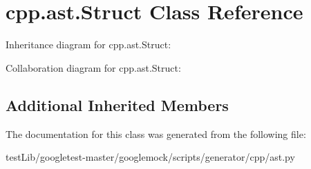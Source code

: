\hypertarget{classcpp_1_1ast_1_1Struct}{}\section{cpp.\+ast.\+Struct Class Reference}
\label{classcpp_1_1ast_1_1Struct}


Inheritance diagram for cpp.\+ast.\+Struct\+:


Collaboration diagram for cpp.\+ast.\+Struct\+:
\subsection*{Additional Inherited Members}


The documentation for this class was generated from the following file\+:\begin{DoxyCompactItemize}
\item 
test\+Lib/googletest-\/master/googlemock/scripts/generator/cpp/ast.\+py\end{DoxyCompactItemize}
